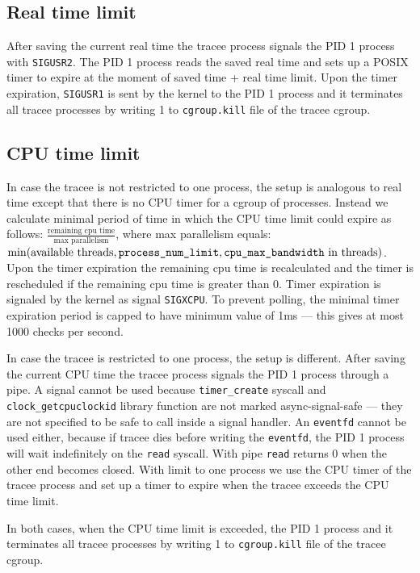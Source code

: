 \documentclass[en]{pracamgr}
\begin{document}
\subsection{Real time limit}

After saving the current real time the tracee process signals the PID 1 process with \texttt{SIGUSR2}. The PID 1 process reads the saved real time and sets up a POSIX timer to expire at the moment of saved time + real time limit. Upon the timer expiration, \texttt{SIGUSR1} is sent by the kernel to the PID 1 process and it terminates all tracee processes by writing 1 to \texttt{cgroup.kill} file of the tracee cgroup.

\subsection{CPU time limit}

In case the tracee is not restricted to one process, the setup is analogous to real time except that there is no CPU timer for a cgroup of processes. Instead we calculate minimal period of time in which the CPU time limit could expire as follows: $\frac{\text{remaining cpu time}}{\text{max parallelism}}$, where max parallelism equals: $\min(\text{available threads}, \text{\texttt{process\_num\_limit}}, \text{\texttt{cpu\_max\_bandwidth} in threads})$. Upon the timer expiration the remaining cpu time is recalculated and the timer is rescheduled if the remaining cpu time is greater than 0. Timer expiration is signaled by the kernel as signal \texttt{SIGXCPU}. To prevent polling, the minimal timer expiration period is capped to have minimum value of 1ms --- this gives at most 1000 checks per second.

In case the tracee is restricted to one process, the setup is different. After saving the current CPU time the tracee process signals the PID 1 process through a pipe. A signal cannot be used because \texttt{timer\_create} syscall and \texttt{clock\_getcpuclockid} library function are not marked async-signal-safe --- they are not specified to be safe to call inside a signal handler. An \texttt{eventfd} cannot be used either, because if tracee dies before writing the \texttt{eventfd}, the PID 1 process will wait indefinitely on the \texttt{read} syscall. With pipe \texttt{read} returns 0 when the other end becomes closed. With limit to one process we use the CPU timer of the tracee process and set up a timer to expire when the tracee exceeds the CPU time limit.

In both cases, when the CPU time limit is exceeded, the PID 1 process and it terminates all tracee processes by writing 1 to \texttt{cgroup.kill} file of the tracee cgroup.
\end{document}
